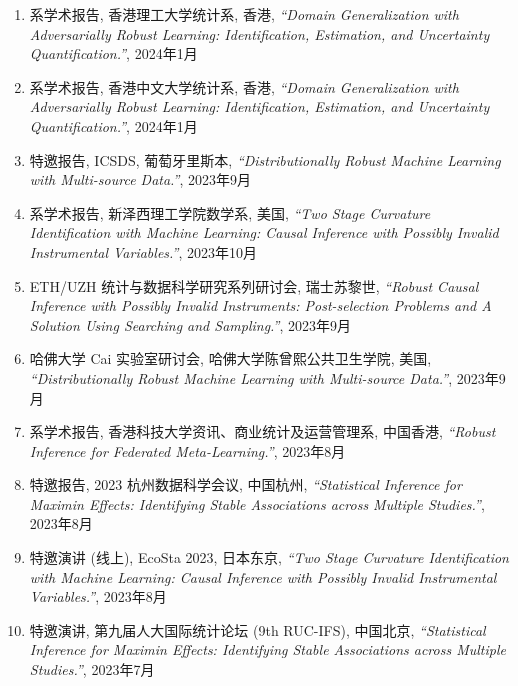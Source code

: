 \documentclass[margin, line]{res}
\begin{document}
\begin{resume}
\begin{enumerate}
            \item 系学术报告, 香港理工大学统计系, 香港, {\it ``Domain Generalization with Adversarially Robust Learning: Identification, Estimation, and Uncertainty Quantification.''}, 
                2024年1月

            \item 系学术报告, 香港中文大学统计系, 香港, {\it ``Domain Generalization with Adversarially Robust Learning: Identification, Estimation, and Uncertainty Quantification.''}, 
                2024年1月

			\item 特邀报告, ICSDS, 葡萄牙里斯本, {\it ``Distributionally Robust Machine Learning with Multi-source Data.''}, 
                2023年9月

            \item 系学术报告, 新泽西理工学院数学系, 美国, {\it ``Two Stage Curvature Identification with Machine Learning: Causal Inference with Possibly Invalid Instrumental Variables.''}, 
                2023年10月

            \item ETH/UZH 统计与数据科学研究系列研讨会, 瑞士苏黎世, 
                {\it ``Robust Causal Inference with Possibly Invalid Instruments: Post-selection Problems and A Solution Using Searching and Sampling.''}, 
                2023年9月

            \item 哈佛大学 Cai 实验室研讨会, 哈佛大学陈曾熙公共卫生学院, 美国, {\it ``Distributionally Robust Machine Learning with Multi-source Data.''}, 
                2023年9月

            \item 系学术报告, 香港科技大学资讯、商业统计及运营管理系, 中国香港, 
                {\it ``Robust Inference for Federated Meta-Learning.''}, 2023年8月

            \item 特邀报告, 2023 杭州数据科学会议, 中国杭州, 
                {\it ``Statistical Inference for Maximin Effects: Identifying Stable Associations across Multiple Studies.''}, 
                2023年8月

            \item 特邀演讲 (线上), EcoSta 2023, 日本东京, {\it ``Two Stage Curvature Identification with Machine Learning: Causal Inference with Possibly Invalid Instrumental Variables.''}, 
                2023年8月

            \item 特邀演讲, 第九届人大国际统计论坛 (9th RUC-IFS), 中国北京, {\it ``Statistical Inference for Maximin Effects: Identifying Stable Associations across Multiple Studies.''}, 
                2023年7月


\end{enumerate}
\end{resume}
\end{document}
